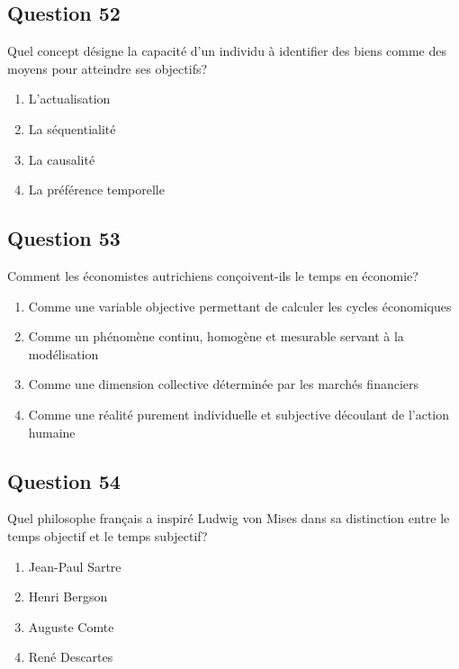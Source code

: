 \documentclass[12pt,a4paper]{article}
\begin{document}
\bigskip


\subsection*{Question 52}
Quel concept désigne la capacité d'un individu à identifier des biens comme des moyens pour atteindre ses objectifs?

\begin{enumerate}[label=\Alph*., leftmargin=*]
\item L'actualisation
\item La séquentialité
\item La causalité
\item La préférence temporelle
\end{enumerate}

\bigskip


\subsection*{Question 53}
Comment les économistes autrichiens conçoivent-ils le temps en économie?

\begin{enumerate}[label=\Alph*., leftmargin=*]
\item Comme une variable objective permettant de calculer les cycles économiques
\item Comme un phénomène continu, homogène et mesurable servant à la modélisation
\item Comme une dimension collective déterminée par les marchés financiers
\item Comme une réalité purement individuelle et subjective découlant de l'action humaine
\end{enumerate}

\bigskip


\subsection*{Question 54}
Quel philosophe français a inspiré Ludwig von Mises dans sa distinction entre le temps objectif et le temps subjectif?

\begin{enumerate}[label=\Alph*., leftmargin=*]
\item Jean-Paul Sartre
\item Henri Bergson
\item Auguste Comte
\item René Descartes
\end{enumerate}
\end{document}

